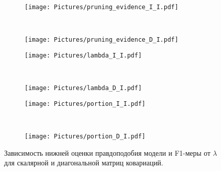 \documentclass[12pt, fleqn, unicode]{article}
\begin{document}
\begin{figure}[!htp]
	\vspace{-1mm}
	\centering
	\begin{subfigure}[!tp]{0.45\textwidth}
		\texttt{[image: Pictures/pruning\_evidence\_I\_I.pdf]}
		\caption{}
		\label{evidence_I_I}
	\end{subfigure}
	\vspace{-1mm}
	~
	\hspace{-2mm}
	\begin{subfigure}[!htbp]{0.45\textwidth}
		\texttt{[image: Pictures/pruning\_evidence\_D\_I.pdf]}
		\caption{}
		\label{evidence_I_D}
	\end{subfigure}
	\newline
	\vspace{-1mm}
	\begin{subfigure}[!htbp]{0.45\textwidth}
		\texttt{[image: Pictures/lambda\_I\_I.pdf]}
		\caption{}
		\label{score_I_I}
	\end{subfigure}
	~
	\begin{subfigure}[!htbp]{0.45\textwidth}
		\texttt{[image: Pictures/lambda\_D\_I.pdf]}
		\caption{}
		\label{score_I_D}
	\end{subfigure}
	\newline
	\begin{subfigure}[!htbp]{0.45\textwidth}
		\texttt{[image: Pictures/portion\_I\_I.pdf]}
		\caption{}
		\label{portion_I_I}
	\end{subfigure}
	~
	\begin{subfigure}[!htbp]{0.45\textwidth}
		\texttt{[image: Pictures/portion\_D\_I.pdf]}
		\caption{}
		\label{portion_I_D}
	\end{subfigure}
	\hspace{1mm}
	\caption{Зависимость нижней оценки правдоподобия модели и F1-меры от $\lambda$ для скалярной и диагональной матриц ковариаций.}
	\label{results}
\end{figure}
\end{document}
